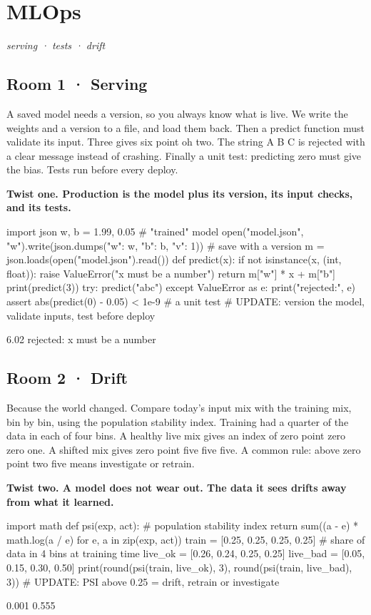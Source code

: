 \documentclass[11pt,a4paper]{report}
\begin{document}
\chapter{MLOps}
\textit{serving · tests · drift}
\section*{Room 1 · Serving}
A saved model needs a version, so you always know what is live. We write the weights and a version to a file, and load them back. Then a predict function must validate its input. Three gives six point oh two. The string A B C is rejected with a clear message instead of crashing. Finally a unit test: predicting zero must give the bias. Tests run before every deploy.
\begin{tcolorbox}[colback=yellow!12,colframe=orange!70!black,boxrule=0.4pt,left=4pt,right=4pt,top=2pt,bottom=2pt]\textbf{Twist one. Production is the model plus its version, its input checks, and its tests.}\end{tcolorbox}
\begin{Code}
import json
w, b = 1.99, 0.05                           # "trained" model
open("model.json", "w").write(json.dumps({"w": w, "b": b, "v": 1}))   # save with a version
m = json.loads(open("model.json").read())
def predict(x):
    if not isinstance(x, (int, float)): raise ValueError("x must be a number")
    return m["w"] * x + m["b"]
print(predict(3))
try: predict("abc")
except ValueError as e: print("rejected:", e)
assert abs(predict(0) - 0.05) < 1e-9        # a unit test
# UPDATE: version the model, validate inputs, test before deploy
\end{Code}
\begin{Out}
6.02
rejected: x must be a number
\end{Out}
\section*{Room 2 · Drift}
Because the world changed. Compare today's input mix with the training mix, bin by bin, using the population stability index. Training had a quarter of the data in each of four bins. A healthy live mix gives an index of zero point zero zero one. A shifted mix gives zero point five five five. A common rule: above zero point two five means investigate or retrain.
\begin{tcolorbox}[colback=yellow!12,colframe=orange!70!black,boxrule=0.4pt,left=4pt,right=4pt,top=2pt,bottom=2pt]\textbf{Twist two. A model does not wear out. The data it sees drifts away from what it learned.}\end{tcolorbox}
\begin{Code}
import math
def psi(exp, act):                          # population stability index
    return sum((a - e) * math.log(a / e) for e, a in zip(exp, act))
train = [0.25, 0.25, 0.25, 0.25]            # share of data in 4 bins at training time
live_ok = [0.26, 0.24, 0.25, 0.25]
live_bad = [0.05, 0.15, 0.30, 0.50]
print(round(psi(train, live_ok), 3), round(psi(train, live_bad), 3))
# UPDATE: PSI above 0.25 = drift, retrain or investigate
\end{Code}
\begin{Out}
0.001 0.555
\end{Out}
\end{document}
